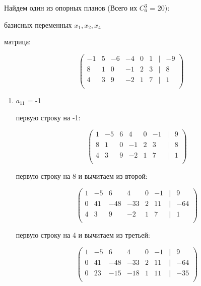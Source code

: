 \documentclass{report}
\begin{document}
\newpage

Найдем один из опорных планов (Всего их $C_6^3$ = 20):

\begin{itemize}
	 базисных переменных $x_1, x_2, x_4$
	
	 матрица:
	
	\begin{center}
		{
			\[
			\begin{pmatrix}
				-1 & 5 & -6 & -4 & 0 & 1 & | & -9 \\
				8 & 1 & 0 & -1 & 2 & 3 & | & 8 \\
				4 & 3 & 9 & -2 & 1 & 7 & | & 1 \\
			\end{pmatrix}
			\]
		}
	\end{center}
	
	\begin{enumerate}
		\item{$a_{11}$ = -1}
		
		\begin{itemize}
			 первую строку на -1:
			
			\begin{center}
				{
					\[
					\begin{pmatrix}
						1 & -5 & 6 & 4 & 0 & -1 & | & 9 \\
						8 & 1 & 0 & -1 & 2 & 3 & | & 8 \\
						4 & 3 & 9 & -2 & 1 & 7 & | & 1 \\
					\end{pmatrix}
					\]
				}
			\end{center}
			
			 первую строку на 8 и вычитаем из второй:
			
			\begin{center}
				{
					\[
					\begin{pmatrix}
						1 & -5 & 6 & 4 & 0 & -1 & | & 9 \\
						0 & 41 & -48 & -33 & 2 & 11 & | & -64 \\
						4 & 3 & 9 & -2 & 1 & 7 & | & 1 \\
					\end{pmatrix}
					\]
				}
			\end{center}
			
			 первую строку на 4 и вычитаем из третьей:
			
			\begin{center}
				{
					\[
					\begin{pmatrix}
						1 & -5 & 6 & 4 & 0 & -1 & | & 9 \\
						0 & 41 & -48 & -33 & 2 & 11 & | & -64 \\
						0 & 23 & -15 & -18 & 1 & 11 & | & -35 \\
					\end{pmatrix}
					\]
				}
			\end{center}
			

\end{itemize}
\end{enumerate}
\end{itemize}
\end{document}
